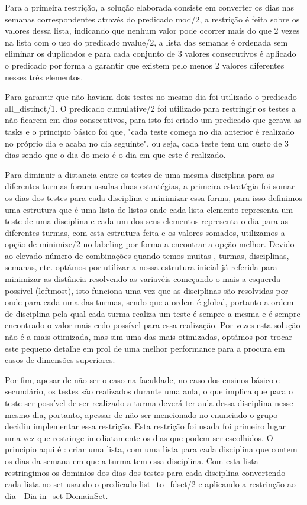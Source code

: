 \documentclass{llncs}
\begin{document}
Para a primeira restrição, a solução elaborada consiste em converter os dias nas semanas correspondentes através do predicado mod/2, a restrição é feita sobre os valores dessa lista, indicando que nenhum valor pode ocorrer mais do que 2 vezes na lista com o uso do predicado nvalue/2, a lista das semanas é ordenada sem eliminar os duplicados e para cada conjunto de 3 valores consecutivos é aplicado o predicado por forma a garantir que existem pelo menos 2 valores diferentes nesses três elementos.

Para garantir que não haviam dois testes no mesmo dia foi utilizado o predicado all\_distinct/1. O predicado cumulative/2 foi utilizado para restringir os testes a não ficarem em dias consecutivos, para isto foi criado um predicado que gerava as tasks e o principio básico foi que, "cada teste começa no dia anterior é realizado no próprio dia e acaba no dia seguinte", ou seja, cada teste tem um custo de 3 dias sendo que o dia do meio é o dia em que este é realizado.

Para diminuir a distancia entre os testes de uma mesma disciplina para as diferentes turmas foram usadas duas estratégias, a primeira estratégia foi somar os dias dos testes para cada disciplina e minimizar essa forma, para isso definimos uma estrutura que é uma lista de listas onde cada lista elemento representa um teste de uma disciplina e cada um dos seus elementos representa o dia para as diferentes turmas, com esta estrutura feita e os valores somados, utilizamos a opção de minimize/2 no labeling por forma a encontrar a opção melhor. Devido ao elevado número de combinações quando temos muitas , turmas, disciplinas, semanas, etc. optámos por utilizar a nossa estrutura inicial já referida para minimizar as distância resolvendo as variavéis começando o mais a esquerda possível (leftmost), isto funciona uma vez que as disciplinas são resolvidas por onde para cada uma das turmas, sendo que a ordem é global, portanto a ordem de disciplina pela qual cada turma realiza um teste é sempre a mesma e é sempre encontrado o valor mais cedo possível para essa realização. Por vezes esta solução não é a mais otimizada, mas sim uma das mais otimizadas, optámos por trocar este pequeno detalhe em prol de uma melhor performance para a procura em casos de dimensões superiores.

Por fim, apesar de não ser o caso na faculdade, no caso dos ensinos básico e secundário, os testes são realizados durante uma aula, o que implica que para o teste ser possível de ser realizado a turma deverá ter aula dessa disciplina nesse mesmo dia, portanto, apessar de não ser mencionado no enunciado o grupo decidiu implementar essa restrição. Esta restrição foi usada foi primeiro lugar uma vez que restringe imediatamente os dias que podem ser escolhidos. O principio aqui é : criar uma lista, com uma lista para cada disciplina que contem os dias da semana em que a turma tem essa disciplina. Com esta lista restringimos os dominios dos dias dos testes para cada disciplina convertendo cada lista no set usando o predicado list\_to\_fdset/2  e aplicando a restrinção ao dia - Dia in\_set DomainSet.
\end{document}
